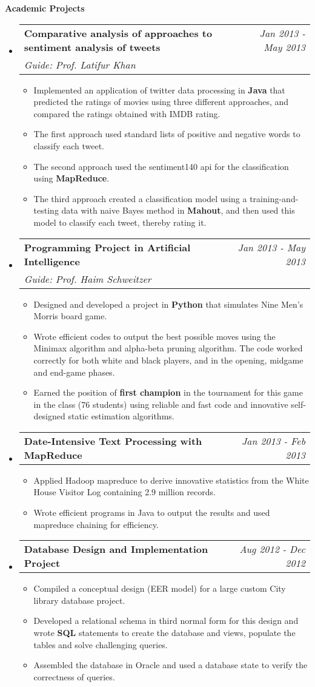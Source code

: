 \documentclass[letterpaper,11pt]{article}
\makeatletter
\newcommand{\resitem}[1]{\item[\ding{226}] #1 \vspace{-2pt}}
\newcommand{\resheading}[1]{{\large \colorbox{mygrey}{\begin{minipage}{\textwidth}{\textbf{#1 \vphantom{p\^{E}}}}\end{minipage}}}}
\newcommand{\ressubheading}[4]{
\begin{tabular*}{7.0in}{l@{\extracolsep{\fill}}r}
		\textbf{#1} & #2 \\
		\textit{#3} & \textit{#4} \\
\end{tabular*}\vspace{-6pt}}
\newcommand{\reslineheading}[2]{
\begin{tabular*}{7.0in}{l@{\extracolsep{\fill}}r}
		\textbf{#1} & #2 \\
\end{tabular*}\vspace{-6pt}}
\makeatother
\begin{document}
\resheading{Academic Projects}
\begin{itemize}

\item
	\ressubheading{Comparative analysis of approaches to sentiment analysis of tweets}{\textit{Jan 2013 - May 2013}}{Guide: Prof. Latifur Khan}{}
	\begin{itemize}
		\resitem{Implemented an application of twitter data processing in \textbf{Java} that predicted the ratings of movies using three different approaches, and compared the ratings obtained with IMDB rating.}
		\resitem{The first approach used standard lists of positive and negative words to classify each tweet.}
		\resitem{The second approach used the sentiment140 api for the classification using \textbf{MapReduce}.}
		\resitem{The third approach created a classification model using a training-and-testing data with naive Bayes method in \textbf{Mahout}, and then used this model to classify each tweet, thereby rating it.}
	\end{itemize}

\item
	\ressubheading{Programming Project in Artificial Intelligence}{\textit{Jan 2013 - May 2013}}{Guide: Prof. Haim Schweitzer}{}
	\begin{itemize}
		\resitem{Designed and developed a project in \textbf{Python} that simulates Nine Men's Morris board game.}
		\resitem{Wrote efficient codes to output the best possible moves using the Minimax algorithm and alpha-beta pruning algorithm. The code worked correctly for both white and black players, and in the opening, midgame and end-game phases.}
		\resitem{Earned the position of \textbf{first champion} in the tournament for this game in the class (76 students) using reliable and fast code and innovative self-designed static estimation algorithms.}
	\end{itemize}

\item
	\reslineheading{Date-Intensive Text Processing with MapReduce}{\textit{Jan 2013 - Feb 2013}}
	\begin{itemize}
		\resitem{Applied Hadoop mapreduce to derive innovative statistics from the White House Visitor Log containing 2.9 million records.}
		\resitem{Wrote efficient programs in Java to output the results and used mapreduce chaining for efficiency.}
	\end{itemize}

\item
	\reslineheading{Database Design and Implementation Project}{\textit{Aug 2012 - Dec 2012}}
	\begin{itemize}
		\resitem{Compiled a conceptual design (EER model) for a large custom City library database project.}
		\resitem{Developed a relational schema in third normal form for this design and wrote \textbf{SQL} statements to create the database and views, populate the tables and solve challenging queries.}
		\resitem{Assembled the database in Oracle and used a database state to verify the correctness of queries.}
	\end{itemize}


\end{itemize}
\end{document}
